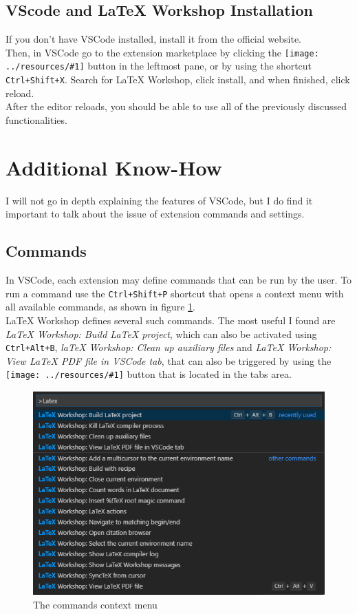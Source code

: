 \documentclass{article}
\newcommand{\latex}{\LaTeX\xspace}
\newcommand{\icon}[2]{\texttt{[image: ../resources/\#1]}\xspace}
\begin{document}
\subsection{VScode and \latex Workshop Installation}
If you don't have VSCode installed, install it from the official website\footnotemark[1].\\
Then, in VSCode go to the extension marketplace by clicking the \icon{extensions_icon.png}{0.4} button in the leftmost pane, or by using the shortcut \texttt{Ctrl+Shift+X}. Search for \latex Workshop, click install, and when finished, click reload.\\
After the editor reloads, you should be able to use all of the previously discussed functionalities.


\section{Additional Know-How} \label{sec:additional_know_how}
I will not go in depth explaining the features of VSCode, but I do find it important to talk about the issue of extension commands and settings.

\subsection{Commands}
In VSCode, each extension may define commands that can be run by the user. To run a command use the \texttt{Ctrl+Shift+P} shortcut that opens a context menu with all available commands, as shown in figure \ref{fig:command_menu}.\\
\latex Workshop defines several such commands. The most useful I found are \emph{LaTeX Workshop: Build LaTeX project}, which can also be activated using \texttt{Ctrl+Alt+B}, \emph{laTeX Workshop: Clean up auxiliary files} and \emph{LaTeX Workshop: View LaTeX PDF file in VSCode tab}, that can also be triggered by using the \icon{preview_icon.png}{0.5} button that is located in the tabs area.
\begin{figure}
	\includegraphics[width=\linewidth]{../resources/command_menu.png}
	\caption{The commands context menu}
	\label{fig:command_menu}
\end{figure}
\end{document}
